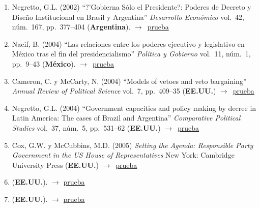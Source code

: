 \documentclass[12 pt, letter]{article}
\newenvironment{CitasMiTrabajo}{
    \begin{footnotesize}
    \begin{enumerate}[label={\footnotesize\emph{cita~\arabic*}},ref=\arabic*] %
        \setlength{\itemsep}{.1\itemsep}
        \setlength{\parskip}{.1\parskip}
    }{\end{enumerate}\end{footnotesize}}
\begin{document}
        \begin{CitasMiTrabajo}

        \item Negretto, G.L. (2002) ``?'Gobierna S\'olo el Presidente?: Poderes de Decreto y Dise\~no Institucional en Brasil y Argentina'' \emph{Desarrollo Econ\'omico} vol.\ 42, n\'um.\ 167, pp.\ 377--404  (\textbf{Argentina}). $\rightarrow$~\href{https://github.com/emagar/cv/blob/master/citasMiTrab/BullyPulpits/negretto.pdf}{prueba}

        \item Nacif, B. (2004) ``Las relaciones entre los poderes ejecutivo y
        legislativo en M\'exico tras el fin del presidencialismo''
        \emph{Pol\'itica y Gobierno} vol.\ 11, n\'um.\ 1, pp.\ 9--43  (\textbf{M\'exico}). $\rightarrow$~\href{https://github.com/emagar/cv/blob/master/citasMiTrab/BullyPulpits/Benito_Nacif_p-9-42.pdf}{prueba}

        \item Cameron, C. y McCarty, N. (2004) ``Models of vetoes and veto
        bargaining'' \emph{Annual Review of Political Science} vol.\ 7, pp.\ 409--35
        (\textbf{EE.UU.}) $\rightarrow$~\href{https://github.com/emagar/cv/blob/master/citasMiTrab/BullyPulpits/cammc.pdf}{prueba}

        \item Negretto, G.L. (2004) ``Government capacities and
        policy making by decree in Latin America: The cases of Brazil and
        Argentina'' \emph{Comparative Political Studies} vol.\ 37, n\'um.\ 5, pp.\ 531--62
        (\textbf{EE.UU.}) $\rightarrow$~\href{https://github.com/emagar/cv/blob/master/citasMiTrab/BullyPulpits/neg2.pdf}{prueba}

        \item Cox, G.W. y McCubbins, M.D. (2005)
        \emph{Setting the Agenda: Responsible Party Government in the US House of Representatives} New
        York: Cambridge University Press (\textbf{EE.UU.}) $\rightarrow$~\href{https://github.com/emagar/cv/blob/master/citasMiTrab/BullyPulpits/coxmcS.pdf}{prueba}

        \item {} (\textbf{EE.UU.}). $\rightarrow$ \href{https://github.com/emagar/cv/blob/master/citasMiTrab/BullyPulpits/pachon2008phd.pdf}{prueba}

        \item {} (\textbf{EE.UU.}). $\rightarrow$ \href{https://github.com/emagar/cv/blob/master/citasMiTrab/BullyPulpits/mejia.pdf}{prueba}


\end{CitasMiTrabajo}
\end{document}
